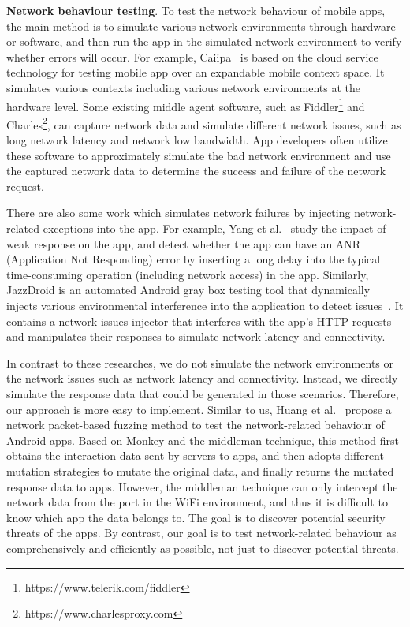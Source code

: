 \documentclass[sigconf,review, anonymous]{acmart}
\begin{document}
\textbf{Network behaviour testing}. To test the network behaviour of mobile apps, the main method is to simulate various network environments through hardware or software, and then run the app in the simulated network environment to verify whether errors will occur. For example, \textsf{Caiipa}~\cite{LBZKLLTSCZ14} is based on the cloud service technology for testing mobile app over an expandable mobile context space. It simulates various contexts including various network environments at the hardware level. 
Some existing middle agent software, such as \textsf{Fiddler}\footnote{https://www.telerik.com/fiddler} and \textsf{Charles}\footnote{https://www.charlesproxy.com}, can capture network data and simulate different network issues, such as long network latency and network low bandwidth. App developers often utilize these software to approximately simulate the bad network environment and use the captured network data to determine the success and failure of the network request. 


There are also some work which simulates network failures by injecting network-related exceptions into the app. For example, Yang et al.~\cite{Yang2013Testing} study the impact of weak response on the app, and detect whether the app can have an ANR (Application Not Responding) error by inserting a long delay into the typical time-consuming operation (including network access) in the app. Similarly, \textsf{JazzDroid} is an automated Android gray box testing tool that dynamically injects various environmental interference into the application to detect issues~\cite{XiongCZXQ18}. It contains a network issues injector that interferes with the app's HTTP requests and manipulates their responses to simulate network latency and connectivity. 

In contrast to these researches, we do not simulate the network environments or the network issues such as network latency and connectivity. Instead, we directly simulate the response data that could be generated in those scenarios. Therefore, our approach is more easy to implement. 
Similar to us, Huang et al.~\cite{HuangZJLL19} propose a network packet-based fuzzing method to test the network-related behaviour of Android apps. Based on \textsf{Monkey} and the middleman technique, this method first obtains the interaction data sent by servers to apps, and then adopts different mutation strategies to mutate the original data, and finally returns the mutated response data to apps. However, the middleman technique can only intercept the network data from the port in the WiFi environment, and thus it is difficult to know which app the data belongs to. 
The goal is to discover potential security threats of the apps. By contrast, our goal is to test network-related behaviour as comprehensively and efficiently as possible, not just to discover potential threats.
\end{document}
